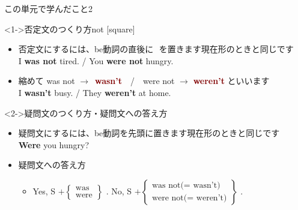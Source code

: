 \documentclass[aspectratio=169,xcolor={dvipsnames,table}]{beamer}
\begin{document}
\begin{frame}[plain]{この単元で学んだこと2}

\begin{block}<1->{否定文のつくり方\hspace{80pt}not }
\small
{}[square]
\begin{itemize}
 \item 否定文にするには、be動詞の直後に\,\,\,\,を置きます\hfill{\scriptsize 現在形のときと同じです}\\
\hfill{}I \textbf{was not} tired.  / You \textbf{were not} hungry.
 \item 縮めて was not $\rightarrow$\,\,\,\textcolor{Maroon}{\bfseries wasn't}\,\,\,\,\,\,/\,\,\,\,\,\,were not $\rightarrow$ \textcolor{Maroon}{\bfseries weren't}%
\hfill{\scriptsize {}といいます}\\
\hfill{}I \textbf{wasn't} busy. / They \textbf{weren't} at home.
\end{itemize}
      \end{block}


\begin{block}<2->{疑問文のつくり方・疑問文への答え方}
\small
\begin{itemize}[square]
 \item 疑問文にするには、be動詞を先頭に置きます\hfill{\scriptsize 現在形のときと同じです}\\
\hfill{}{\bfseries Were} you hungry?
 \item 疑問文への答え方
\begin{itemize}[circle]
 \item Yes, S $+ \left\{\begin{array}{l}
		  \text{was}\\
		\text{were}\end{array}\right\}$\,\,.
\hspace{20pt}
No, S $+ \left\{\begin{array}{l}
		  \text{was not($=$ wasn't)}\\
		\text{were not($=$ weren't)}\end{array}\right\}$\,\,.
\end{itemize}
\end{itemize}
      \end{block}
\end{frame}
\end{document}

